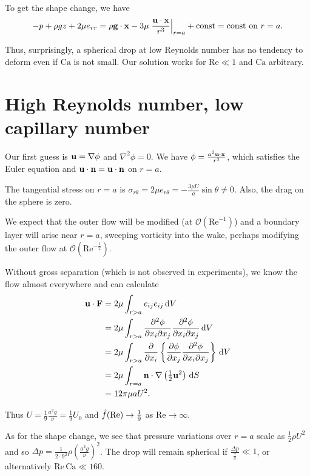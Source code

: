 \documentclass{notes}
\newcommand{\cO}{\mathcal{O}}
\newcommand{\Rey}{\mathrm{Re}}
\newcommand{\Ca}{\mathrm{Ca}}
\theoremstyle{plain}
\begin{document}
To get the shape change, we have
\[
-p + \rho g z + 2 \mu e_{rr} = \rho \mathbf{g} \cdot \mathbf{x} - 3 \mu \left.
\frac{\mathbf{u} \cdot \mathbf{x}}{r^3} \right|_{r = a} + \text{const} = \text{const on
$r = a$.}
\]

Thus, surprisingly, a spherical drop at low Reynolds number has no
tendency to deform even if $\Ca$ is not small.  Our solution works for
$\Rey \ll 1$ and $\Ca$ arbitrary.

\section{High Reynolds number, low capillary number}

\vspace{1in}

Our first guess is $\mathbf{u} = \nabla \phi$ and $\nabla^2 \phi = 0$.
We have $\phi = \frac{a^2 \mathbf{u} \cdot \mathbf{x}}{r^3}$, which satisfies the Euler
equation and $\mathbf{u} \cdot \mathbf{n} = \mathbf{u} \cdot \mathbf{n}$ on $r=a$.

The tangential stress on $r=a$ is $\sigma_{r \theta} = 2 \mu e_{r \theta}
= - \frac{3 \mu U}{a} \sin \theta \neq 0$. Also, the drag on the sphere
is zero.

We expect that the outer flow will be modified (at $\cO(\Rey^{-1})$)
and a boundary layer will arise near $r=a$, sweeping vorticity into
the wake, perhaps modifying the outer flow at
$\cO(\Rey^{-\frac{1}{2}})$.

Without gross separation (which is not observed in experiments), we know
the flow almost everywhere and can calculate
\begin{align*}
\mathbf{u} \cdot \mathbf{F} &= 2 \mu \int_{r > a} e_{ij} e_{i j}\, \mathrm{d} V \\
&= 2 \mu \int_{r > a} \frac{\partial ^2 \phi}{\partial x_i \partial x_j}
\frac{\partial ^2 \phi}{\partial x_i \partial x_j}\, \mathrm{d} V \\
&= 2 \mu \int_{r > a} \frac{\partial }{\partial x_i} \left\{ \frac{\partial \phi}{\partial x_j}
\frac{\partial ^2 \phi}{\partial x_i \partial x_j}\right\}\, \mathrm{d} V \\
&= 2 \mu \int_{r = a} \mathbf{n} \cdot \nabla \left(\tfrac{1}{2} \mathbf{u}^2\right)\,
\mathrm{d} S \\
&= 12 \pi \mu a U^2.
\end{align*}

Thus $U = \frac{1}{9} \frac{a^2 g}{\nu} = \frac{1}{9} U_0$ and
$\Hat{f}(\Rey) \to \frac{1}{9}$ as $\Rey \to \infty$.

\vspace{1in}

As for the shape change, we see that pressure variations over $r=a$
scale as $\tfrac{1}{2} \rho U^2$ and so $\Delta p = \tfrac{1}{2 \cdot
9^2} \rho \left( \frac{a^2 g}{\nu} \right)^2$.  The drop will remain
spherical if $\frac{\Delta p}{\frac{\gamma}{a}} \ll 1$, or alternatively
$\Rey\, \Ca \ll 160$.
\end{document}
